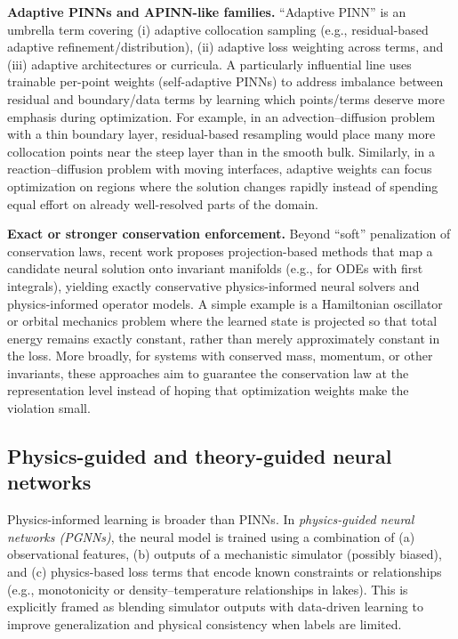 \documentclass[11pt]{article}
\begin{document}
    \textbf{Adaptive PINNs and APINN-like families.} ``Adaptive PINN'' is an umbrella term covering (i) adaptive collocation sampling (e.g., residual-based adaptive refinement/distribution), (ii) adaptive loss weighting across terms, and (iii) adaptive architectures or curricula. A particularly influential line uses trainable per-point weights (self-adaptive PINNs) to address imbalance between residual and boundary/data terms by learning which points/terms deserve more emphasis during optimization. For example, in an advection--diffusion problem with a thin boundary layer, residual-based resampling would place many more collocation points near the steep layer than in the smooth bulk. Similarly, in a reaction--diffusion problem with moving interfaces, adaptive weights can focus optimization on regions where the solution changes rapidly instead of spending equal effort on already well-resolved parts of the domain.

    \textbf{Exact or stronger conservation enforcement.} Beyond ``soft'' penalization of conservation laws, recent work proposes projection-based methods that map a candidate neural solution onto invariant manifolds (e.g., for ODEs with first integrals), yielding exactly conservative physics-informed neural solvers and physics-informed operator models. A simple example is a Hamiltonian oscillator or orbital mechanics problem where the learned state is projected so that total energy remains exactly constant, rather than merely approximately constant in the loss. More broadly, for systems with conserved mass, momentum, or other invariants, these approaches aim to guarantee the conservation law at the representation level instead of hoping that optimization weights make the violation small.

    \subsection{Physics-guided and theory-guided neural networks}

    Physics-informed learning is broader than PINNs. In \emph{physics-guided neural networks (PGNNs)}, the neural model is trained using a combination of (a) observational features, (b) outputs of a mechanistic simulator (possibly biased), and (c) physics-based loss terms that encode known constraints or relationships (e.g., monotonicity or density--temperature relationships in lakes). This is explicitly framed as blending simulator outputs with data-driven learning to improve generalization and physical consistency when labels are limited.
\end{document}
